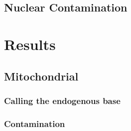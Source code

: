 \documentclass[a4paper,12pt]{article}
\begin{document}
\subsection{Nuclear Contamination}
\section{Results}

\subsection{Mitochondrial}


\subsubsection{Calling the endogenous base}
\subsubsection{Contamination}



{}

\end{document}
